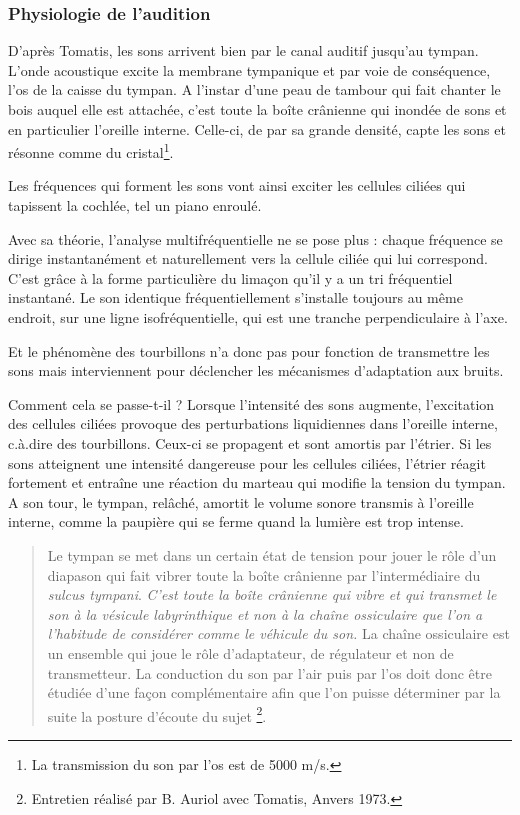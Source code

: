 \subsubsection{Physiologie de l'audition}

D'après Tomatis, les sons arrivent bien par le canal auditif
jusqu'au tympan. L'onde acoustique excite la membrane tympanique et
par voie de conséquence, l'os de la caisse du tympan. 
A l'instar d'une
peau de tambour qui fait chanter le bois auquel elle est attachée,
c'est toute la boîte crânienne qui inondée de sons et en particulier
l'oreille interne. Celle-ci, de par sa grande densité, capte les sons
et résonne comme du cristal\footnote{La transmission du son par l'os est de 5000 m/s.}.

Les fréquences qui forment les sons vont ainsi exciter les cellules
ciliées qui tapissent la cochlée, tel un piano enroulé.
 
Avec sa théorie, l'analyse multifréquentielle ne se pose plus
: chaque fréquence se dirige instantanément et naturellement 
vers la cellule ciliée qui lui correspond. 
C'est grâce à la forme
particulière du limaçon qu'il y a un tri fréquentiel instantané.
Le son identique fréquentiellement s'installe toujours au même endroit, sur une ligne isofréquentielle, qui est une tranche perpendiculaire à l'axe.

Et le phénomène des tourbillons n'a donc pas pour fonction de transmettre les sons mais interviennent pour déclencher les mécanismes d'adaptation aux bruits. 

Comment cela se passe-t-il ? Lorsque l'intensité des sons augmente,
l'excitation des cellules ciliées provoque des perturbations liquidiennes
dans l'oreille interne, c.à.dire des tourbillons. Ceux-ci se propagent
et sont amortis par l'étrier. Si les sons atteignent une intensité
dangereuse pour les cellules ciliées, l'étrier réagit fortement et
entraîne une réaction du marteau qui modifie la tension du tympan.
A son tour, le tympan, relâché, amortit le volume sonore transmis
à l'oreille interne, comme la paupière qui se ferme quand la lumière
est trop intense.


\begin{quotation}
Le tympan se met dans un certain état de tension pour jouer le
rôle d'un diapason qui fait vibrer toute la boîte crânienne
par l'intermédiaire du \emph{sulcus tympani}. 
\emph{C'est toute la boîte crânienne qui vibre et qui transmet le son à la vésicule labyrinthique et non à la chaîne ossiculaire que l'on a l'habitude de considérer comme le véhicule du son.} La chaîne ossiculaire est un ensemble qui
joue le rôle d'adaptateur, de régulateur et non de transmetteur. La
conduction du son par l'air puis par l'os doit donc
être étudiée d'une façon complémentaire afin que l'on
puisse déterminer par la suite la posture d'écoute du sujet%
\footnote{Entretien réalisé par B. Auriol avec Tomatis, Anvers 1973.}.
	
\end{quotation}

